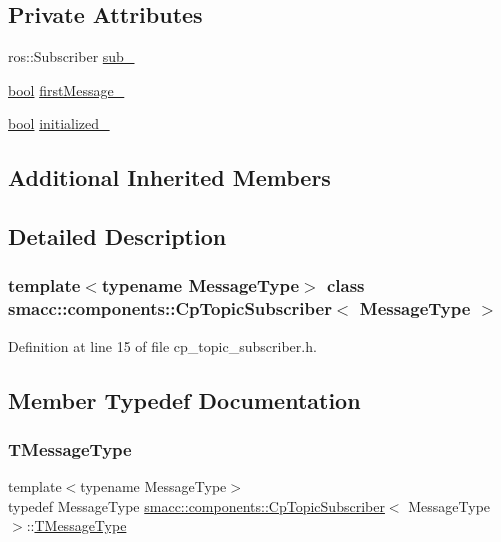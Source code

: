 \subsection*{Private Attributes}
\begin{DoxyCompactItemize}
\item 
ros\+::\+Subscriber \hyperlink{classsmacc_1_1components_1_1CpTopicSubscriber_a87f9c87f6b7c0801dff4fcc7519dbe0e}{sub\+\_\+}
\item 
\hyperlink{classbool}{bool} \hyperlink{classsmacc_1_1components_1_1CpTopicSubscriber_aadbaf8c0f0a2a5bea38f41356528f41c}{first\+Message\+\_\+}
\item 
\hyperlink{classbool}{bool} \hyperlink{classsmacc_1_1components_1_1CpTopicSubscriber_a666e60629820ef146ade691a36c41e0a}{initialized\+\_\+}
\end{DoxyCompactItemize}
\subsection*{Additional Inherited Members}


\subsection{Detailed Description}
\subsubsection*{template$<$typename Message\+Type$>$\newline
class smacc\+::components\+::\+Cp\+Topic\+Subscriber$<$ Message\+Type $>$}



Definition at line 15 of file cp\+\_\+topic\+\_\+subscriber.\+h.



\subsection{Member Typedef Documentation}
\mbox{\label{classsmacc_1_1components_1_1CpTopicSubscriber_acdc1cefead832fd249b0fceb2c3b28b0}} 
\subsubsection{\texorpdfstring{T\+Message\+Type}{TMessageType}}
{\footnotesize\ttfamily template$<$typename Message\+Type$>$ \\
typedef Message\+Type \hyperlink{classsmacc_1_1components_1_1CpTopicSubscriber}{smacc\+::components\+::\+Cp\+Topic\+Subscriber}$<$ Message\+Type $>$\+::\hyperlink{classsmacc_1_1components_1_1CpTopicSubscriber_acdc1cefead832fd249b0fceb2c3b28b0}{T\+Message\+Type}}



